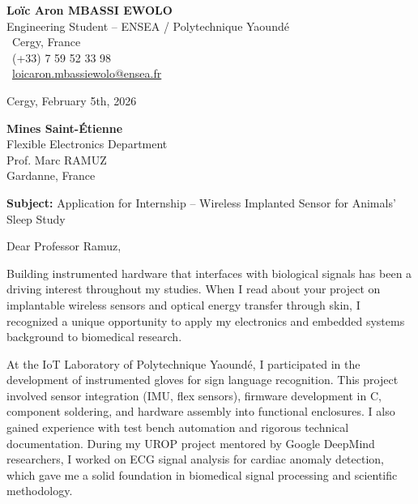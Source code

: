 \documentclass[a4paper,11pt]{article}
\begin{document}
\noindent
\begin{minipage}[t]{0.5\textwidth}
    \textbf{Loïc Aron MBASSI EWOLO}\\
    Engineering Student -- ENSEA / Polytechnique Yaoundé\\[3pt]
    \faMapMarker\ Cergy, France\\
    \faPhone\ (+33) 7 59 52 33 98\\
    \faEnvelope\ \href{mailto:loicaron.mbassiewolo@ensea.fr}{loicaron.mbassiewolo@ensea.fr}
\end{minipage}
\hfill
\begin{minipage}[t]{0.4\textwidth}
    \raggedleft
    Cergy, February 5th, 2026
\end{minipage}

\vspace{1.2cm}

\hfill
\begin{minipage}[t]{0.5\textwidth}
    \raggedleft
    \textbf{Mines Saint-Étienne}\\
    Flexible Electronics Department\\
    Prof. Marc RAMUZ\\
    Gardanne, France
\end{minipage}

\vspace{1cm}

\noindent\textbf{Subject:} Application for Internship -- Wireless Implanted Sensor for Animals' Sleep Study

\vspace{0.8cm}

Dear Professor Ramuz,

Building instrumented hardware that interfaces with biological signals has been a driving interest throughout my studies. When I read about your project on implantable wireless sensors and optical energy transfer through skin, I recognized a unique opportunity to apply my electronics and embedded systems background to biomedical research.

At the IoT Laboratory of Polytechnique Yaoundé, I participated in the development of instrumented gloves for sign language recognition. This project involved sensor integration (IMU, flex sensors), firmware development in C, component soldering, and hardware assembly into functional enclosures. I also gained experience with test bench automation and rigorous technical documentation. During my UROP project mentored by Google DeepMind researchers, I worked on ECG signal analysis for cardiac anomaly detection, which gave me a solid foundation in biomedical signal processing and scientific methodology.
\end{document}
